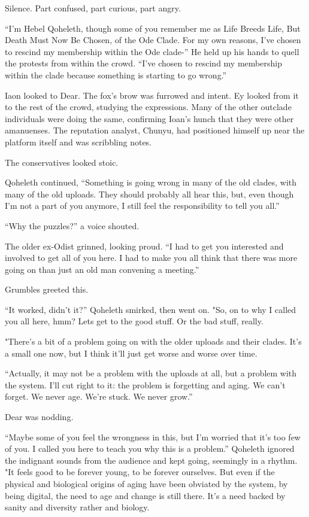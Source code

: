 Silence. Part confused, part curious, part angry.

``I'm Hebel Qoheleth, though some of you remember me as Life Breeds Life, But Death Must Now Be Chosen, of the Ode Clade. For my own reasons, I've chosen to rescind my membership within the Ode clade-'' He held up his hands to quell the protests from within the crowd. ``I've chosen to rescind my membership within the clade because something is starting to go wrong.''

Iaon looked to Dear. The fox's brow was furrowed and intent. Ey looked from it to the rest of the crowd, studying the expressions. Many of the other outclade individuals were doing the same, confirming Ioan's hunch that they were other amanuenses. The reputation analyst, Chunyu, had positioned himself up near the platform itself and was scribbling notes.

The conservatives looked stoic.

Qoheleth continued, ``Something is going wrong in many of the old clades, with many of the old uploads. They should probably all hear this, but, even though I'm not a part of you anymore, I still feel the responsibility to tell you all.''

``Why the puzzles?'' a voice shouted.

The older ex-Odist grinned, looking proud. ``I had to get you interested and involved to get all of you here. I had to make you all think that there was more going on than just an old man convening a meeting.''

Grumbles greeted this.

``It worked, didn't it?'' Qoheleth smirked, then went on. "So, on to why I called you all here, hmm? Lets get to the good stuff. Or the bad stuff, really.

"There's a bit of a problem going on with the older uploads and their clades. It's a small one now, but I think it'll just get worse and worse over time.

``Actually, it may not be a problem with the uploads at all, but a problem with the system. I'll cut right to it: the problem is forgetting and aging. We can't forget. We never age. We're stuck. We never grow.''

Dear was nodding.

``Maybe some of you feel the wrongness in this, but I'm worried that it's too few of you. I called you here to teach you why this is a problem.'' Qoheleth ignored the indignant sounds from the audience and kept going, seemingly in a rhythm. "It feels good to be forever young, to be forever ourselves. But even if the physical and biological origins of aging have been obviated by the system, by being digital, the need to age and change is still there. It's a need backed by sanity and diversity rather and biology.

